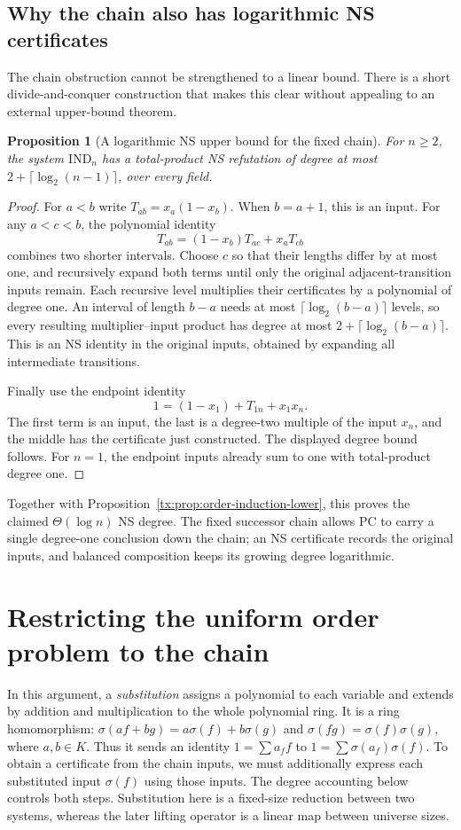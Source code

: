 \documentclass[11pt,a4paper,oneside,openany]{book}
\newtheorem{proposition}[theorem]{Proposition}
\theoremstyle{definition}\newtheorem{definition}[theorem]{Definition}
\theoremstyle{remark}\newtheorem{remark}[theorem]{Remark}
\numberwithin{equation}{chapter}
\begin{document}
\subsection{Why the chain also has logarithmic NS certificates}
The chain obstruction cannot be strengthened to a linear bound.
There is a short divide-and-conquer construction that makes this
clear without appealing to an external upper-bound theorem.

\begin{proposition}[A logarithmic NS upper bound for the fixed chain]
\label{tx:prop:order-induction-upper}
For $n\ge2$, the system $\mathrm{IND}_n$ has a total-product NS
refutation of degree at most $2+\lceil\log_2(n-1)\rceil$, over every field.
\end{proposition}
\begin{proof}
For $a<b$ write $T_{ab}=x_a(1-x_b)$. When $b=a+1$, this is
an input. For any $a<c<b$, the polynomial identity
\[
 T_{ab}=(1-x_b)T_{ac}+x_aT_{cb}
\]
combines two shorter intervals. Choose $c$ so that their lengths
differ by at most one, and recursively expand both terms until only
the original adjacent-transition inputs remain. Each recursive level
multiplies their certificates by a polynomial of degree one. An
interval of length $b-a$ needs at most
$\lceil\log_2(b-a)\rceil$ levels, so every resulting multiplier--input
product has degree at most $2+\lceil\log_2(b-a)\rceil$.
This is an NS identity in the original inputs, obtained by expanding
all intermediate transitions.

Finally use the endpoint identity
\[
                1=(1-x_1)+T_{1n}+x_1x_n.
\]
The first term is an input, the last is a degree-two multiple of the
input $x_n$, and the middle has the certificate just constructed.
The displayed degree bound follows. For $n=1$, the endpoint inputs
already sum to one with total-product degree one.
\end{proof}

Together with Proposition~\ref{tx:prop:order-induction-lower}, this
proves the claimed $\Theta(\log n)$ NS degree. The fixed successor chain
allows PC to carry a single degree-one conclusion down the chain;
an NS certificate records the original inputs, and balanced
composition keeps its growing degree logarithmic.

\section{Restricting the uniform order problem to the chain}
In this argument, a \emph{substitution} assigns a polynomial to each
variable and extends by addition and multiplication to the whole
polynomial ring. It is a ring homomorphism:
$\sigma(af+bg)=a\sigma(f)+b\sigma(g)$ and
$\sigma(fg)=\sigma(f)\sigma(g)$, where $a,b\in K$.
Thus it sends an identity $1=\sum a_ff$ to
$1=\sum\sigma(a_f)\sigma(f)$.
To obtain a certificate from the chain inputs, we must additionally
express each substituted input $\sigma(f)$ using those inputs.
The degree accounting below controls both steps. Substitution here
is a fixed-size reduction between two systems, whereas the later
lifting operator is a linear map between universe sizes.
\end{document}
